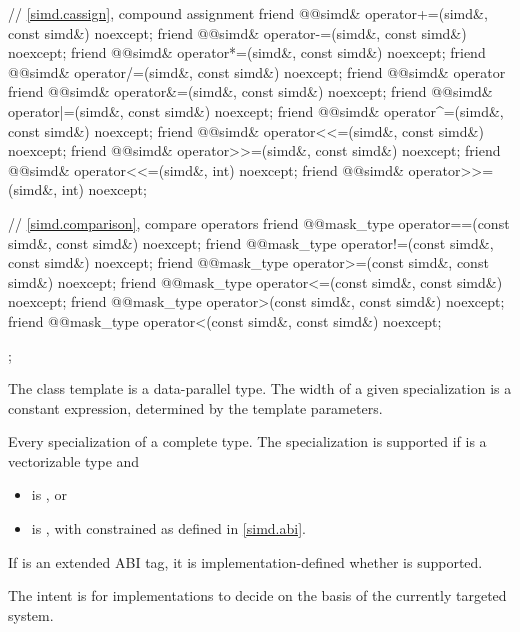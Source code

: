 \begin{codeblock}
{  // \ref{simd.cassign},  compound assignment
  friend @@simd& operator+=(simd&, const simd&) noexcept;
  friend @@simd& operator-=(simd&, const simd&) noexcept;
  friend @@simd& operator*=(simd&, const simd&) noexcept;
  friend @@simd& operator/=(simd&, const simd&) noexcept;
  friend @@simd& operator%
  friend @@simd& operator&=(simd&, const simd&) noexcept;
  friend @@simd& operator|=(simd&, const simd&) noexcept;
  friend @@simd& operator^=(simd&, const simd&) noexcept;
  friend @@simd& operator<<=(simd&, const simd&) noexcept;
  friend @@simd& operator>>=(simd&, const simd&) noexcept;
  friend @@simd& operator<<=(simd&, int) noexcept;
  friend @@simd& operator>>=(simd&, int) noexcept;

  // \ref{simd.comparison},  compare operators
  friend @@mask_type operator==(const simd&, const simd&) noexcept;
  friend @@mask_type operator!=(const simd&, const simd&) noexcept;
  friend @@mask_type operator>=(const simd&, const simd&) noexcept;
  friend @@mask_type operator<=(const simd&, const simd&) noexcept;
  friend @@mask_type operator>(const simd&, const simd&) noexcept;
  friend @@mask_type operator<(const simd&, const simd&) noexcept;
};
\end{codeblock}

\pnum
The class template  is a data-parallel type. The width of a given  specialization is a constant expression, determined by the template parameters.

\pnum
Every specialization of   a complete type. The specialization  is supported if  is a vectorizable type and
\begin{itemize}
  \item {} is , or
  \item {} is , with  constrained as defined in \ref{simd.abi}.
\end{itemize}

If  is an extended ABI tag, it is implementation-defined whether  is supported. \begin{note}The intent is for implementations to decide on the basis of the currently targeted system.\end{note}

